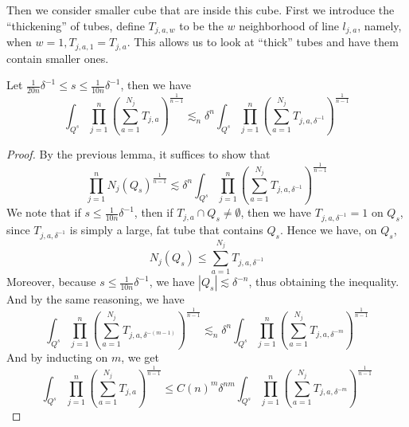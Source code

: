 Then we consider smaller cube that are inside this cube. First we introduce the ``thickening'' of tubes, define $T_{j,a,w}$ to be the $w$ neighborhood of line $l_{j,a}$, namely, when $w=1, T_{j,a,1}=T_{j,a}$. This allows us to look at ``thick'' tubes and have them contain smaller ones.
\begin{lemma}
    Let $\frac{1}{20n}\delta^{-1}\leq s\leq\frac{1}{10n}\delta^{-1}$, then we have
    \begin{equation*}
        \int_{Q^s}\prod_{j=1}^n\left(\sum_{a=1}^{N_j}T_{j,a}\right)^{\frac{1}{n-1}}\lesssim_n \delta^n\int_{Q^s}\prod_{j=1}^n \left(\sum_{a=1}^{N_j}T_{j,a,\delta^{-1}} \right)^{\frac{1}{n-1}}
    \end{equation*}
\end{lemma}
\begin{proof}
    By the previous lemma, it suffices to show that 
    \begin{equation*}
        \prod_{j=1}^nN_j(Q_s)^{\frac{1}{n-1}}\lesssim \delta^n\int_{Q^s}\prod_{j=1}^n \left(\sum_{a=1}^{N_j}T_{j,a,\delta^{-1}} \right)^{\frac{1}{n-1}}
    \end{equation*}
    We note that if $s\leq\frac{1}{10n}\delta^{-1}$, then if $T_{j,a}\cap Q_s\neq\emptyset$, then we have $T_{j,a,\delta^{-1}}=1$ on $Q_s$, since $T_{j,a,\delta^{-1}}$ is simply a large, fat tube that contains $Q_s$. Hence we have, on $Q_s$, 
    \begin{equation*}
        N_j(Q_s)\leq\sum_{a=1}^{N_j}T_{j,a,\delta^{-1}}
    \end{equation*}
    Moreover, because $s\leq\frac{1}{10n}\delta^{-1}$, we have $|Q_s|\lesssim\delta^{-n}$, thus obtaining the inequality. And by the same reasoning, we have
    \begin{equation*}
        \int_{Q^s}\prod_{j=1}^n\left(\sum_{a=1}^{N_j}T_{j,a,\delta^{-(m-1)}}\right)^{\frac{1}{n-1}}\lesssim_n \delta^n\int_{Q^s}\prod_{j=1}^n \left(\sum_{a=1}^{N_j}T_{j,a,\delta^{-m}} \right)^{\frac{1}{n-1}}
    \end{equation*}
    And by inducting on $m$, we get
    \begin{equation*}
        \int_{Q^s}\prod_{j=1}^n\left(\sum_{a=1}^{N_j}T_{j,a}\right)^{\frac{1}{n-1}}\leq C(n)^m \delta^{nm}\int_{Q^s}\prod_{j=1}^n \left(\sum_{a=1}^{N_j}T_{j,a,\delta^{-m}} \right)^{\frac{1}{n-1}}
    \end{equation*}
\end{proof}

